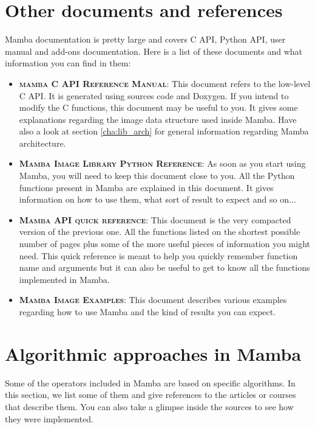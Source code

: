 \documentclass[a4paper,10pt,oneside]{article}
\begin{document}
\section{Other documents and references}
\label{cha:other_docs}

Mamba documentation is pretty large and covers C API, Python API, user manual 
and add-ons documentation. Here is a list of these documents and what 
information you can find in them:

\begin{itemize}
\item \textbf{\textsc{mamba C API Reference Manual}}: This document refers to the
low-level C API. It is generated using sources code and Doxygen. If you intend 
to modify the C functions, this document may be useful to you. It gives some
explanations regarding the image data structure used inside Mamba. Have also
a look at section \ref{cha:lib_arch} for general information regarding Mamba
architecture.
\item \textbf{\textsc{Mamba Image Library Python Reference}}: As soon as you
start using Mamba, you will need to keep this document close to you. All the
Python functions present in Mamba are explained in this document. It gives
information on how to use them, what sort of result to expect and so on... 
\item \textbf{\textsc{Mamba API quick reference}}: This document is the very
compacted version of the previous one. All the functions listed on the shortest
possible number of pages plus some of the more useful pieces of information you
might need. This quick reference is meant to help you quickly remember function
name and arguments but it can also be useful to get to know all the functions
implemented in Mamba.
\item \textbf{\textsc{Mamba Image Examples}}: This document describes various
examples regarding how to use Mamba and the kind of results you can expect.
\end{itemize}

\pagebreak

\section{Algorithmic approaches in Mamba}

Some of the operators included in Mamba are based on specific algorithms.
In this section, we list some of them and give references to the articles or 
courses that describe them. You can also take a glimpse inside the sources to
see how they were implemented.
\end{document}
